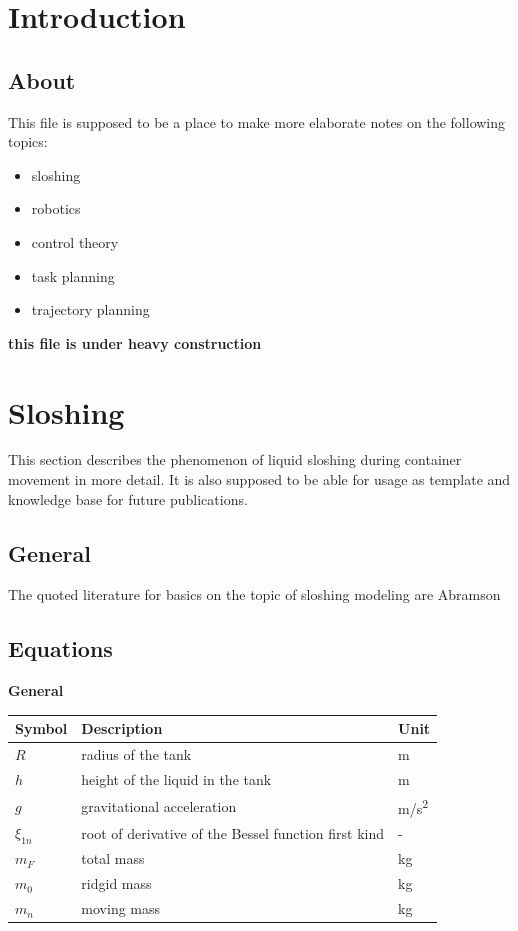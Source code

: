 \documentclass{ltxdockit}
\begin{document}
\printtitlepage
\tableofcontents

\section{Introduction}
\label{sec:intro}

\subsection[About]{About}
\label{sec:intro:about}

This file is supposed to be a place to make more elaborate notes on the following topics: 

\begin{itemize}
\item sloshing
\item robotics
\item control theory
\item task planning
\item trajectory planning 
\end{itemize}

\textbf{this file is under heavy construction}

\section{Sloshing}
\label{sec:sloshing}

This section describes the phenomenon of liquid sloshing during container movement in more detail. It is also supposed to be able for usage as template and knowledge base for future publications.

\subsection{General}
\label{sec:sloshing:general}

The quoted literature for basics on the topic of sloshing modeling are Abramson \cite{abramson_dynamic_1966}

\subsection{Equations}
\label{sec:sloshing:equations}

\textbf{General}

\begin{tabular}{|l|l|l|}
\hline
\textbf{Symbol} & \textbf{Description} & \textbf{Unit} \\
\hline
$R$ & radius of the tank & m \\
\hline
$h$ & height of the liquid in the tank & m \\
\hline
$g$ & gravitational acceleration & m/s\textsuperscript{2} \\
\hline
$\xi_{1n}$ & root of derivative of the Bessel function first kind & - \\
\hline
$m_F$ & total mass & kg \\
\hline
$m_0$ & ridgid mass & kg \\
\hline
$m_n$ & moving mass & kg \\
\hline
\end{tabular}
\end{document}
